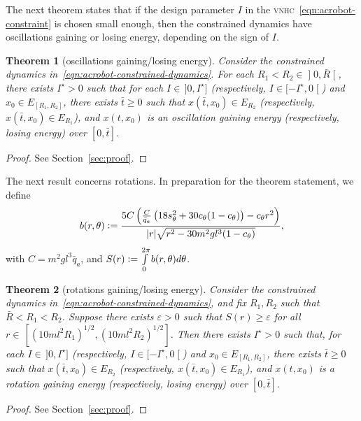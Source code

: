 \documentclass[journal,twoside,web, twocolumn]{ieeecolor}
\newtheorem{thm}{Theorem}%
\newcommand*{\eqdef}{\vcentcolon=}
\newcommand*{\vnhc}{\textsc{vnhc}\xspace}
\begin{document}
The next theorem states that if the design parameter $I$ in the \vnhc~\eqref{eqn:acrobot-constraint} is chosen small enough, then the constrained dynamics have oscillations gaining or losing energy, depending on the sign of $I$.


\begin{thm}[oscillations gaining/losing energy]\label{thm:acrobot-oscillations}
 Consider the constrained dynamics in~\eqref{eqn:acrobot-constrained-dynamics}. For each $R_1<R_2 \in \mathopen] 0, \bar R \mathclose[$, there exists \(I^\star > 0\) such that for each \(I \in \, ]0,I^\star]\) (respectively, $I \in [-I^\star,0\mathclose[$) and $x_0 \in E_{[R_1,R_2]}$, there exists $\bar t\geq 0$ such that $x(\bar t,x_0) \in E_{R_2}$ (respectively, $x(\bar t, x_0) \in E_{R_1}$), and $x(t,x_0)$ is an oscillation gaining energy (respectively, losing energy) over $[0, \bar t]$. 
\end{thm}

\begin{proof}
 See Section~\ref{sec:proof}.
\end{proof}

The next result concerns rotations.  In preparation for the theorem statement, we define 
    \[
        b(r,\theta) \eqdef 
        \frac{5C \left(
        \frac{C}{\bar{q}_a}\left(18s_\theta^2 + 30c_\theta(1 - c_\theta)\right)
            - c_\theta r^2
        \right)}{
        | r|\sqrt{ r^2 - 30m^2gl^3(1 - c_\theta)}
        },
\]
with \(C = m^2gl^3\bar{q}_a\), and 
        \(S( r) \eqdef \int \limits_{0}^{2\pi} b(r,\theta)d\theta\).


\begin{thm}[rotations gaining/losing energy]\label{thm:acrobot-rotations}
    Consider the constrained dynamics
    in~\eqref{eqn:acrobot-constrained-dynamics}, and fix $R_1, R_2$ such that
    \(\bar R<R_1<R_2\). Suppose there exists \(\varepsilon > 0\) such that \(S(
    r) \geq \varepsilon\) for all \( r \in \, [(10 m l^2 R_1)^{1/2}, (10 m l^2
    R_2)^{1/2}]\). Then there exists \(I^{\star}>0\) such that, for each \(I \in
    \, ]0,I^{\star}]\) (respectively, $I \in [-I^\star,0\mathclose[$) and $x_0
    \in E_{[R_1,R_2]}$, there exists $\bar t \geq 0$ such that $x(\bar t,x_0)
    \in E_{R_2}$  (respectively, $x(\bar t, x_0) \in E_{R_1}$), and $x(t,x_0)$
    is a rotation gaining energy (respectively, losing energy) over $[0, \bar
    t]$. 
\end{thm}
\begin{proof}
See Section~\ref{sec:proof}.
\end{proof}
\end{document}
